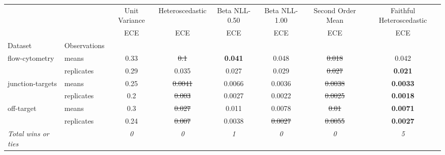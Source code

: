 \begin{tabular}{ll|c|c|c|c|c|c}
\toprule
{} & {} & {Unit Variance} & {Heteroscedastic} & {Beta NLL-0.50} & {Beta NLL-1.00} & {Second Order Mean} & {Faithful Heteroscedastic} \\
{} & {} & {ECE} & {ECE} & {ECE} & {ECE} & {ECE} & {ECE} \\
{Dataset} & {Observations} & {} & {} & {} & {} & {} & {} \\
\midrule
\multirow[t]{2}{*}{flow-cytometry} & means & 0.33 & \sout{0.1} & \textbf{0.041} & 0.048 & \sout{0.018} & 0.042 \\
 & replicates & 0.29 & 0.035 & 0.027 & 0.029 & \sout{0.027} & \textbf{0.021} \\
\multirow[t]{2}{*}{junction-targets} & means & 0.25 & \sout{0.0041} & 0.0066 & 0.0036 & \sout{0.0038} & \textbf{0.0033} \\
 & replicates & 0.2 & \sout{0.003} & 0.0027 & 0.0022 & \sout{0.0025} & \textbf{0.0018} \\
\multirow[t]{2}{*}{off-target} & means & 0.3 & \sout{0.027} & 0.011 & 0.0078 & \sout{0.01} & \textbf{0.0071} \\
 & replicates & 0.24 & \sout{0.007} & 0.0038 & \sout{0.0027} & \sout{0.0055} & \textbf{0.0027} \\
\textit{{Total wins or ties}} &  & \textit{0} & \textit{0} & \textit{1} & \textit{0} & \textit{0} & \textit{5} \\
\bottomrule
\end{tabular}
